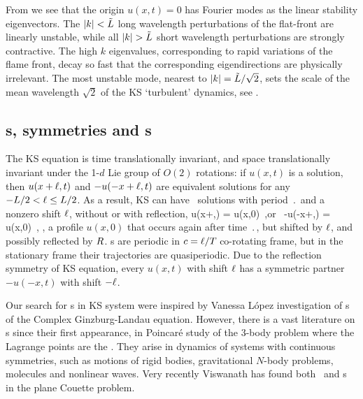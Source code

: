 From  we see that the origin $u(x,t) = 0$
has Fourier modes as the linear stability eigenvectors.
The $|k|<\tilde{L}$
long wavelength perturbations of the flat-front {\eqv}
are linearly unstable, while all
$|k|> \tildeL$ short wavelength perturbations are strongly contractive.
The high $k$ eigenvalues, corresponding to rapid variations of
the flame front, decay so fast that the corresponding eigendirections
are physically irrelevant.
The most unstable mode, nearest to $|k|=\tilde{L}/\sqrt{2}$,
sets the scale of the mean wavelength $\sqrt{2}$
of the KS `turbulent' dynamics,
see .

\subsection{\Rpo s, symmetries and \po s} \label{sec:KSePO}

The KS equation  is time translationally invariant,
and space translationally invariant
under the 1-$d$ Lie group of $O(2)$ rotations: if
$u(x,t)$ is a solution, then $u(x+\ell,t)$ and
$-u(-x+\ell,t)$ are equivalent
solutions for any $-L/2 < \ell \leq L/2$.
As a result, KS can have
\rpo\ solutions with period $\period{}$ and
a nonzero shift $\ell$, without or with reflection,
\beq
u(x+\shift,\period{}) = u(x,0)
\,,\qquad \mbox{or } \quad
-u(-x+\shift,\period{}) = u(x,0)
\,,
\ie, a profile $u(x,0)$ that occurs again after time $\period{}$,
but shifted by $\ell$, and possibly reflected by $R$.
{\Rpo s} are periodic in $c=\ell/{T_{}}$
co-rotating frame,
but in the stationary frame their trajectories
are quasiperiodic.
Due to the reflection symmetry  of KS equation,
every {\rpo}
$u(x,t)$ with shift $\ell$ has a symmetric partner
$-u(-x,t)$ with shift $-\ell$.

Our search for \rpo s in KS system were
inspired by Vanessa L{\'o}pez investigation
of {\rpo s} of the Complex Ginzburg-Landau equation.
However, there is a vast literature on
{\rpo s} since their first appearance,
in  Poincar\'e study of
the 3-body problem where
the Lagrange points are the \reqva.
They arise in dynamics of systems
with continuous symmetries, such as motions of rigid bodies, gravitational
$N$-body problems, molecules and nonlinear waves.
Very recently Viswanath %
has found both \reqva\ and \rpo s in the plane Couette problem.

